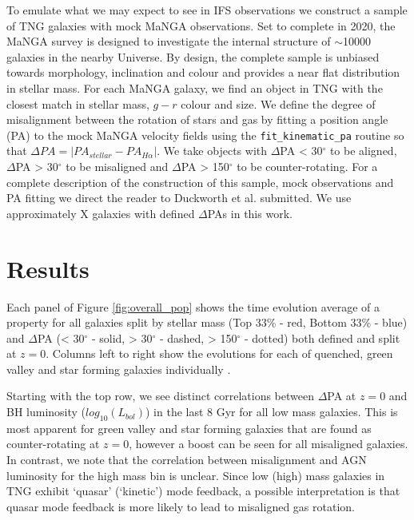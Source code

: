 \documentclass[fleqn,usenatbib]{mnras}
\begin{document}
To emulate what we may expect to see in IFS observations we construct a sample of TNG galaxies with mock MaNGA \citep[Mapping Galaxies at Apache Point;][]{bundy2015, blanton2017} observations. Set to complete in 2020, the MaNGA survey is designed to investigate the internal structure of $\sim$10000 galaxies in the nearby Universe. By design, the complete sample is unbiased towards morphology, inclination and colour and provides a near flat distribution in stellar mass. For each MaNGA galaxy, we find an object in TNG with the closest match in stellar mass, $g-r$ colour and size. We define the degree of misalignment between the rotation of stars and gas by fitting a position angle (PA) to the mock MaNGA velocity fields using the \texttt{fit\_kinematic\_pa} routine \citep[see Appendix C of][for a description of the process]{krajnovic2006} so that $\Delta PA = |PA_{stellar} - PA_{H\alpha}|$. We take objects with $\Delta$PA < 30$^{\circ}$ to be aligned, $\Delta$PA > 30$^{\circ}$ to be misaligned and $\Delta$PA > 150$^{\circ}$ to be counter-rotating. For a complete description of the construction of this sample, mock observations and PA fitting we direct the reader to Duckworth et al. submitted. We use approximately X galaxies with defined $\Delta$PAs in this work. 

\section{Results} \label{sec:results}
Each panel of Figure \ref{fig:overall_pop} shows the time evolution average of a property for all galaxies split by stellar mass (Top 33\% - red, Bottom 33\% - blue) and $\Delta$PA (< 30$^{\circ}$ - solid, > 30$^{\circ}$ - dashed, > 150$^{\circ}$ - dotted) both defined and split at $z=0$. Columns left to right show the evolutions for each of quenched, green valley and star forming galaxies individually \cite[defined by deviation from the star forming main-sequence ][]{pillepich2019}. 

Starting with the top row, we see distinct correlations between $\Delta$PA at $z=0$ and BH luminosity ($log_{10}(L_{bol})$) in the last 8 Gyr for all low mass galaxies. This is most apparent for green valley and star forming galaxies that are found as counter-rotating at $z=0$, however a boost can be seen for all misaligned galaxies. In contrast, we note that the correlation between misalignment and AGN luminosity for the high mass bin is unclear. Since low (high) mass galaxies in TNG exhibit `quasar' (`kinetic') mode feedback, a possible interpretation is that quasar mode feedback is more likely to lead to misaligned gas rotation.
\end{document}
